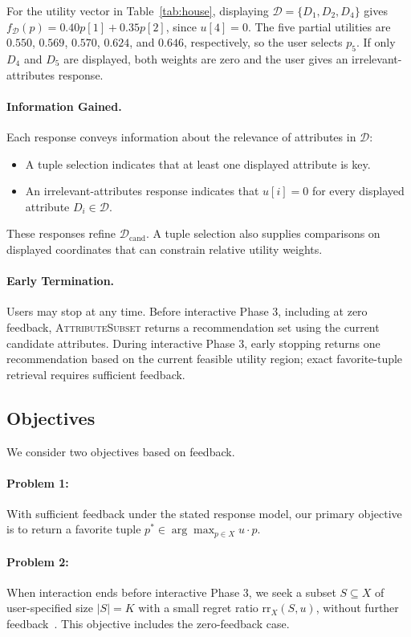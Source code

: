 \documentclass[conference]{IEEEtran}
\theoremstyle{definition}
\theoremstyle{plain}
\begin{document}
For the utility vector in Table~\ref{tab:house}, displaying $\mathcal{D}=\{D_1,D_2,D_4\}$ gives $f_\mathcal{D}(p)=0.40p[1]+0.35p[2]$, since $u[4]=0$. The five partial utilities are $0.550$, $0.569$, $0.570$, $0.624$, and $0.646$, respectively, so the user selects $p_5$. If only $D_4$ and $D_5$ are displayed, both weights are zero and the user gives an irrelevant-attributes response.

\paragraph{Information Gained.}
Each response conveys information about the relevance of attributes in $\mathcal{D}$:
\begin{itemize}
    \item A tuple selection indicates that at least one displayed attribute is key.
    \item An irrelevant-attributes response indicates that $u[i]=0$ for every displayed attribute $D_i\in\mathcal{D}$.
\end{itemize}
These responses refine $\mathcal{D}_\text{cand}$. A tuple selection also supplies comparisons on displayed coordinates that can constrain relative utility weights.

\paragraph{Early Termination.}
Users may stop at any time. Before interactive Phase 3, including at zero feedback, \textsc{AttributeSubset} returns a recommendation set using the current candidate attributes. During interactive Phase 3, early stopping returns one recommendation based on the current feasible utility region; exact favorite-tuple retrieval requires sufficient feedback.

\subsection{Objectives}

We consider two objectives based on feedback.

\paragraph{Problem 1: }\label{p1}
With sufficient feedback under the stated response model, our primary objective is to return a favorite tuple $p^*\in\arg\max_{p\in X}u\cdot p$.

\paragraph{Problem 2: }\label{p2}
When interaction ends before interactive Phase 3, we seek a subset $S\subseteq X$ of user-specified size $\lvert S\rvert=K$ with a small regret ratio $\mathrm{rr}_X(S,u)$, without further feedback~\cite{NS10}. This objective includes the zero-feedback case.
\end{document}
